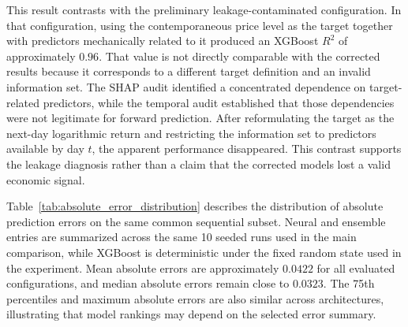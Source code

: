 \documentclass[utf8]{FrontiersinHarvard} %
\begin{document}
This result contrasts with the preliminary leakage-contaminated configuration. In that configuration, using the contemporaneous price level as the target together with predictors mechanically related to it produced an XGBoost \(R^2\) of approximately \(0.96\). That value is not directly comparable with the corrected results because it corresponds to a different target definition and an invalid information set. The SHAP audit identified a concentrated dependence on target-related predictors, while the temporal audit established that those dependencies were not legitimate for forward prediction. After reformulating the target as the next-day logarithmic return and restricting the information set to predictors available by day \(t\), the apparent performance disappeared. This contrast supports the leakage diagnosis rather than a claim that the corrected models lost a valid economic signal.

Table~\ref{tab:absolute_error_distribution} describes the distribution of absolute prediction errors on the same common sequential subset. Neural and ensemble entries are summarized across the same 10 seeded runs used in the main comparison, while XGBoost is deterministic under the fixed random state used in the experiment. Mean absolute errors are approximately \(0.0422\) for all evaluated configurations, and median absolute errors remain close to \(0.0323\). The 75th percentiles and maximum absolute errors are also similar across architectures, illustrating that model rankings may depend on the selected error summary.
\end{document}

